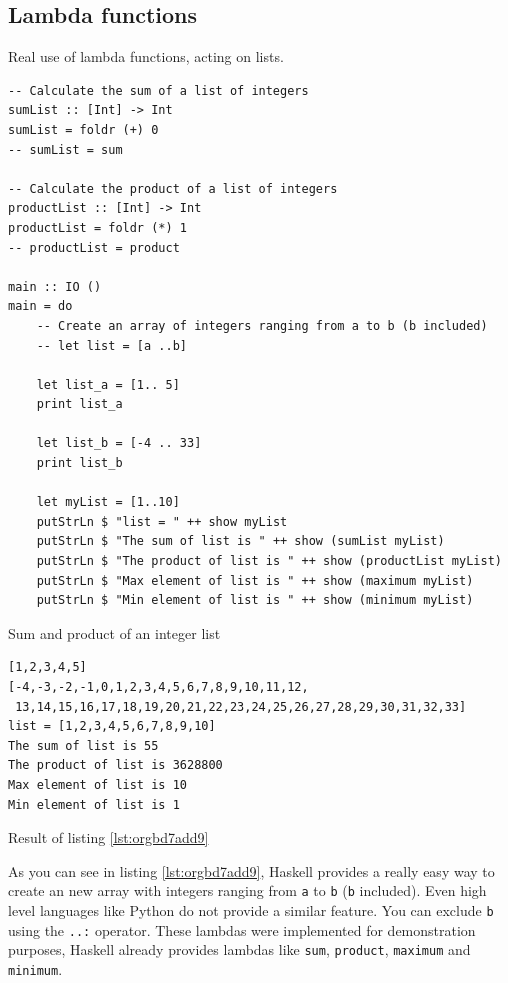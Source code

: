 \documentclass[a4paper, titlepage, twoside]{article}
\begin{document}
\subsection{Lambda functions}
\label{sec:org6306bb9}

Real use of lambda functions, acting on lists.

\begin{listing}[htbp]
\begin{verbatim}
-- Calculate the sum of a list of integers
sumList :: [Int] -> Int
sumList = foldr (+) 0
-- sumList = sum
  
-- Calculate the product of a list of integers
productList :: [Int] -> Int
productList = foldr (*) 1
-- productList = product

main :: IO ()
main = do
    -- Create an array of integers ranging from a to b (b included)
    -- let list = [a ..b]

    let list_a = [1.. 5]
    print list_a

    let list_b = [-4 .. 33]
    print list_b

    let myList = [1..10]
    putStrLn $ "list = " ++ show myList
    putStrLn $ "The sum of list is " ++ show (sumList myList)
    putStrLn $ "The product of list is " ++ show (productList myList)
    putStrLn $ "Max element of list is " ++ show (maximum myList)
    putStrLn $ "Min element of list is " ++ show (minimum myList)
\end{verbatim}
\caption{\label{lst:orgbd7add9}Sum and product of an integer list}
\end{listing}

\begin{listing}[htbp]
\begin{verbatim}
[1,2,3,4,5]
[-4,-3,-2,-1,0,1,2,3,4,5,6,7,8,9,10,11,12,
 13,14,15,16,17,18,19,20,21,22,23,24,25,26,27,28,29,30,31,32,33]
list = [1,2,3,4,5,6,7,8,9,10]
The sum of list is 55
The product of list is 3628800
Max element of list is 10
Min element of list is 1
\end{verbatim}
\caption{Result of listing \ref{lst:orgbd7add9}}
\end{listing}

As you can see in listing \ref{lst:orgbd7add9}, Haskell provides a really easy way to create an new array with integers ranging from \texttt{a} to \texttt{b} (\texttt{b} included). Even high level languages like Python do not provide a similar feature. You can exclude \texttt{b} using the \texttt{..:} operator. These lambdas were implemented for demonstration purposes, Haskell already provides lambdas like \texttt{sum}, \texttt{product}, \texttt{maximum} and \texttt{minimum}.
\end{document}
